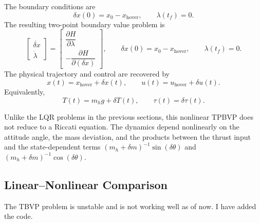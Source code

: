 The boundary conditions are
\begin{equation}
    \delta x(0)=x_0-x_{\mathrm{hover}},
    \qquad
    \lambda(t_f)=0.
\end{equation}
The resulting two-point boundary value problem is
\begin{equation}
    \begin{bmatrix}
        \dot{\delta x} \\
        \dot\lambda
    \end{bmatrix}
    =
    \begin{bmatrix}
        \dfrac{\partial H}{\partial \lambda} \\
        -\dfrac{\partial H}{\partial (\delta x)}
    \end{bmatrix},
    \qquad
    \delta x(0)=x_0-x_{\mathrm{hover}},
    \qquad
    \lambda(t_f)=0.
\end{equation}
The physical trajectory and control are recovered by
\begin{equation}
    x(t)=x_{\mathrm{hover}}+\delta x(t),
    \qquad
    u(t)=u_{\mathrm{hover}}+\delta u(t).
\end{equation}
Equivalently,
\begin{equation}
    T(t)=m_hg+\delta T(t),
    \qquad
    \tau(t)=\delta\tau(t).
\end{equation}

Unlike the LQR problems in the previous sections, this nonlinear TPBVP does not reduce to a Riccati equation. The dynamics depend nonlinearly on the attitude angle, the mass deviation, and the products between the thrust input and the state-dependent terms \((m_h+\delta m)^{-1}\sin(\delta\theta)\) and \((m_h+\delta m)^{-1}\cos(\delta\theta)\).

\subsection{Linear--Nonlinear Comparison}

The TBVP problem is unstable and is not working well as of now. I have added the code.

